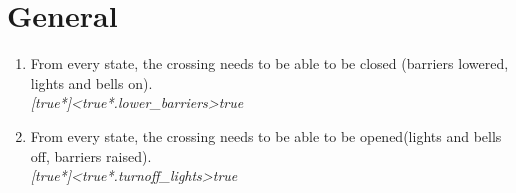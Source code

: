 \documentclass[final]{report}
\begin{document}
\section{General}
\begin{enumerate}
\item From every state, the crossing needs to be able to be closed (barriers lowered, lights and bells on).\\
\textit{[true*]<true*.lower\_barriers>true}
\item From every state, the crossing needs to be able to be opened(lights and bells off, barriers raised).\\
\textit{[true*]<true*.turnoff\_lights>true}
\end{enumerate}
\end{document}
